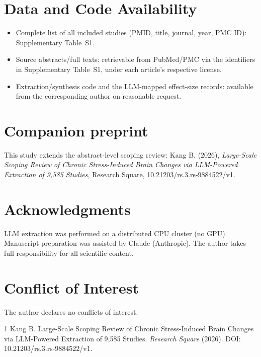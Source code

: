 \documentclass[11pt]{article}
\begin{document}
\section*{Data and Code Availability}
\begin{itemize}
\item Complete list of all included studies (PMID, title, journal, year, PMC
ID): Supplementary Table~S1.
\item Source abstracts/full texts: retrievable from PubMed/PMC via the
identifiers in Supplementary Table~S1, under each article's respective license.
\item Extraction/synthesis code and the LLM-mapped effect-size records: available
from the corresponding author on reasonable request.
\end{itemize}

\section*{Companion preprint}
This study extends the abstract-level scoping review:
Kang B. (2026), \emph{Large-Scale Scoping Review of Chronic Stress-Induced Brain
Changes via LLM-Powered Extraction of 9,585 Studies}, Research Square,
\href{https://doi.org/10.21203/rs.3.rs-9884522/v1}{10.21203/rs.3.rs-9884522/v1}.

\section*{Acknowledgments}
LLM extraction was performed on a distributed CPU cluster (no GPU). Manuscript
preparation was assisted by Claude (Anthropic). The author takes full
responsibility for all scientific content.

\section*{Conflict of Interest}
The author declares no conflicts of interest.

\begin{thebibliography}{1}
 Kang B. Large-Scale Scoping Review of Chronic
Stress-Induced Brain Changes via LLM-Powered Extraction of 9,585 Studies. {\it
Research Square} (2026). DOI: 10.21203/rs.3.rs-9884522/v1.
\end{thebibliography}
\end{document}
